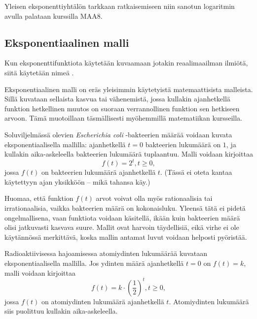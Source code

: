 Yleisen eksponenttiyhtälön tarkkaan ratkaisemiseen niin sanotun logaritmin avulla palataan kurssilla MAA8. %

\subsection{Eksponentiaalinen malli}

Kun eksponenttifunktiota käytetään kuvaamaan jotakin reaalimaailman ilmiötä, siitä käytetään nimeä .

Eksponentiaalinen malli on eräs yleisimmin käytetyistä matemaattisista malleista. Sillä kuvataan sellaista kasvua tai vähenemistä, jossa kullakin ajanhetkellä funktion hetkellinen muutos on suoraan verrannollinen funktion sen hetkiseen arvoon. Tämä muotoillaan täsmällisesti myöhemmillä matematiikan kursseilla.

\begin{esimerkki}
Soluviljelmässä olevien \textit{Escherichia coli} -bakteerien määrää voidaan kuvata eksponentiaalisella mallilla: ajanhetkellä $t = 0$ bakteerien lukumäärä on $1$, ja kullakin aika-askeleella bakteerien lukumäärä tuplaantuu. Malli voidaan kirjoittaa %
\[
f(t) = 2^t, t \ge 0,
\]
jossa $f(t)$ on bakteerien lukumäärä ajanhetkellä $t$. (Tässä ei oteta kantaa käytettyyn ajan yksikköön -- mikä tahansa käy.)

Huomaa, että funktion $f(t)$ arvot voivat olla myös rationaalisia tai irrationaalisia, vaikka bakteerien määrä on kokonaisluku. Yleensä tätä ei pidetä ongelmallisena, vaan funktiota voidaan käsitellä, ikään kuin bakteerien määrä olisi jatkuvasti kasvava suure. Mallit ovat harvoin täydellisiä, eikä virhe ei ole käytännössä merkittävä, koska mallin antamat luvut voidaan helposti pyöristää.

\begin{center}
	\begin{kuvaajapohja}{0.8}{0}{6}{-1}{9} %
	\end{kuvaajapohja}
\end{center}

\end{esimerkki}

\begin{esimerkki}
Radioaktiivisessa hajoamisessa atomiydinten lukumäärää kuvataan eksponentiaalisella mallilla. Jos ydinten määrä ajanhetkellä $t = 0$ on $f(t) = k$, malli voidaan kirjoittaa
\[
f(t) = k \cdot \left( \frac{1}{2} \right)^t, t \ge 0,
\]
jossa $f(t)$ on atomiydinten lukumäärä ajanhetkellä $t$. Atomiydinten lukumäärä siis puolittuu kullakin aika-askeleella.
\end{esimerkki}

